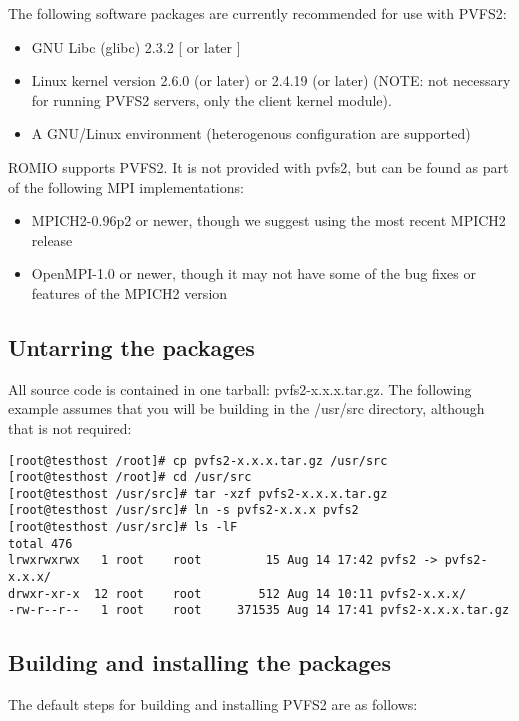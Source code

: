 \documentclass[11pt, letterpaper]{article}
\begin{document}
The following software packages are currently recommended for use with PVFS2:
\begin{itemize}
\item GNU Libc (glibc) 2.3.2 [ or later ]
\item Linux kernel version 2.6.0 (or later) or 2.4.19 (or later) (NOTE: not
necessary for running PVFS2 servers, only the client kernel module).  
\item A GNU/Linux environment (heterogenous configuration are
supported)
\end{itemize}

ROMIO supports PVFS2.  It is not provided with pvfs2, but can be found
as part of the following MPI implementations:

\begin{itemize}
\item MPICH2-0.96p2 or newer, though we suggest using the most recent MPICH2
release
\item OpenMPI-1.0 or newer, though it may not have some of the bug fixes or
features of the MPICH2 version
\end{itemize}

\subsection{Untarring the packages}

All source code is contained in one tarball: pvfs2-x.x.x.tar.gz.  The
following example assumes that you will be building in the /usr/src
directory, although that is not required:

\begin{verbatim}
[root@testhost /root]# cp pvfs2-x.x.x.tar.gz /usr/src
[root@testhost /root]# cd /usr/src
[root@testhost /usr/src]# tar -xzf pvfs2-x.x.x.tar.gz
[root@testhost /usr/src]# ln -s pvfs2-x.x.x pvfs2
[root@testhost /usr/src]# ls -lF
total 476
lrwxrwxrwx   1 root    root         15 Aug 14 17:42 pvfs2 -> pvfs2-x.x.x/
drwxr-xr-x  12 root    root        512 Aug 14 10:11 pvfs2-x.x.x/
-rw-r--r--   1 root    root     371535 Aug 14 17:41 pvfs2-x.x.x.tar.gz
\end{verbatim}

\subsection{Building and installing the packages}

The default steps for building and installing PVFS2 are as follows:
\end{document}
